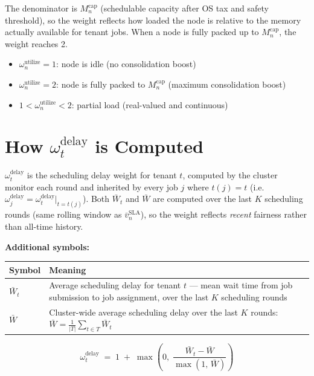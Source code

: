 \documentclass[11pt]{article}
\newcommand{\vbarsla}{\bar{v}_n^{\text{SLA}}}
\newcommand{\Mcap}{M_n^{\text{cap}}}
\newcommand{\omutilize}{\omega_n^{\text{utilize}}}
\newcommand{\omdelay}{\omega_j^{\text{delay}}}
\newcommand{\omdelayt}{\omega_t^{\text{delay}}}
\begin{document}
The denominator is $\Mcap$ (schedulable capacity after OS tax and safety
threshold), so the weight reflects how loaded the node is relative to the
memory actually available for tenant jobs. When a node is fully packed up to
$\Mcap$, the weight reaches 2.

\begin{itemize}[noitemsep, topsep=4pt]
  \item $\omutilize = 1$: node is idle (no consolidation boost)
  \item $\omutilize = 2$: node is fully packed to $\Mcap$ (maximum consolidation boost)
  \item $1 < \omutilize < 2$: partial load (real-valued and continuous)
\end{itemize}

\section{How $\omdelayt$ is Computed}
\label{app:omega}

$\omdelayt$ is the scheduling delay weight for tenant $t$, computed by the
cluster monitor each round and inherited by every job $j$ where $t(j) = t$
(i.e.\ $\omdelay = \omdelayt\big|_{t=t(j)}$). Both $\bar{W}_t$ and $\bar{W}$
are computed over the last $K$ scheduling rounds (same rolling window as
$\vbarsla$), so the weight reflects \emph{recent} fairness rather than
all-time history.

\medskip
\noindent\textbf{Additional symbols:}

\begin{center}
\begin{tabular}{@{}l p{10.5cm}@{}}
\toprule
Symbol & Meaning \\
\midrule
$\bar{W}_t$ & Average scheduling delay for tenant $t$ --- mean wait time from
  job submission to job assignment, over the last $K$ scheduling rounds \\[6pt]
$\bar{W}$ & Cluster-wide average scheduling delay over the last $K$ rounds:
  $\displaystyle\bar{W} = \frac{1}{|T|}\sum_{t \in T} \bar{W}_t$ \\
\bottomrule
\end{tabular}
\end{center}

\[
  \omdelayt \;=\; 1 \;+\; \max\!\left(0,\;
    \frac{\bar{W}_t - \bar{W}}{\max\!\left(1,\, \bar{W}\right)}
    \right)
\]
\end{document}
